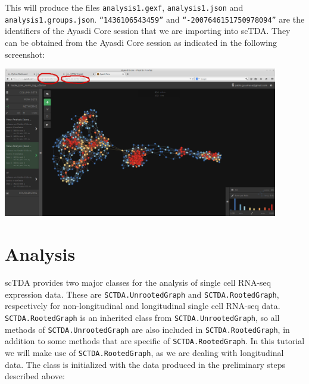 \documentclass[letterpaper,10pt,english]{/usr/share/sphinx/texinputs/sphinxhowto}
\begin{document}
This will produce the files \texttt{analysis1.gexf}, \texttt{analysis1.json} and
\texttt{analysis1.groups.json}. \texttt{``1436106543459''} and \texttt{``-2007646151750978094''}
are the identifiers of the Ayasdi Core session that we are importing
into scTDA. They can be obtained from the Ayasdi Core session as
indicated in the following screenshot:
\begin{center}
\includegraphics[width = 120mm]{figs/f3.jpg}    
\end{center}

\section{Analysis}

scTDA provides two major classes for the analysis of single cell RNA-seq
expression data. These are \texttt{SCTDA.UnrootedGraph} and \texttt{SCTDA.RootedGraph},
respectively for non-longitudinal and longitudinal single cell RNA-seq
data. \texttt{SCTDA.RootedGraph} is an inherited class from \texttt{SCTDA.UnrootedGraph},
so all methods of \texttt{SCTDA.UnrootedGraph} are also included in
\texttt{SCTDA.RootedGraph}, in addition to some methods that are specific of
\texttt{SCTDA.RootedGraph}. In this tutorial we will make use of
\texttt{SCTDA.RootedGraph}, as we are dealing with longitudinal data. The class
is initialized with the data produced in the preliminary steps described
above:

\end{document}
